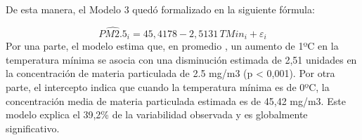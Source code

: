 \documentclass[
  spanish,
  letterpaper,
  DIV=11,
  numbers=noendperiod]{scrartcl}
\begin{document}
\begin{table}[H]

\caption{\label{tbl-mod-met}Comparación de MRLS con predictores
meteorológicos}


\end{table}%

De esta manera, el Modelo 3 quedó formalizado en la siguiente fórmula:

\[
\widehat{PM2.5}_{i}
= 45{,}4178 - 2{,}5131\,TMin_i + \varepsilon_i
\]Por una parte, el modelo estima que, en promedio , un aumento de 1ºC
en la temperatura mínima se asocia con una disminución estimada de 2,51
unidades en la concentración de materia particulada de 2.5 mg/m3 (p
\textless{} 0,001). Por otra parte, el intercepto indica que cuando la
temperatura mínima es de 0ºC, la concentración media de materia
particulada estimada es de 45,42 mg/m3. Este modelo explica el 39,2\% de
la variabilidad observada y es globalmente significativo.
\end{document}
